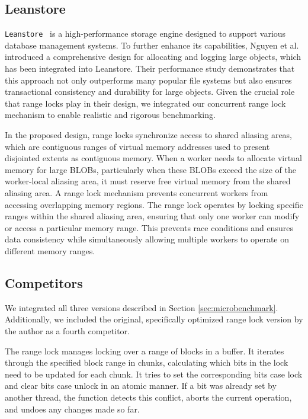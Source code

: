 \subsection{Leanstore}

\texttt{Leanstore}~\parencite{leis2018leanstore} is a high-performance storage engine designed to support various database management systems. 
To further enhance its capabilities, Nguyen et al.~\parencite{nguyen2024files} introduced a comprehensive design for allocating and logging large objects, which has been integrated into Leanstore. 
Their performance study demonstrates that this approach not only outperforms many popular file systems but also ensures transactional consistency and durability for large objects. Given the crucial role that range locks play in their design, we integrated our concurrent range lock mechanism to enable realistic and rigorous benchmarking.

In the proposed design, range locks synchronize access to shared aliasing areas, which are contiguous ranges of virtual memory addresses used to present disjointed extents as contiguous memory. 
When a worker needs to allocate virtual memory for large BLOBs, particularly when these BLOBs exceed the size of the worker-local aliasing area, it must reserve free virtual memory from the shared aliasing area. 
A range lock mechanism prevents concurrent workers from accessing overlapping memory regions. 
The range lock operates by locking specific ranges within the shared aliasing area, ensuring that only one worker can modify or access a particular memory range. 
This prevents race conditions and ensures data consistency while simultaneously allowing multiple workers to operate on different memory ranges. 

\subsection{Competitors}

We integrated all three versions described in Section \ref{sec:microbenchmark}. 
Additionally, we included the original, specifically optimized range lock version by the author as a fourth competitor. 

The range lock manages locking over a range of blocks in a buffer. It iterates through the specified block range in chunks, calculating which bits in the lock need to be updated for each chunk. It tries to set the corresponding bits case lock and clear bits case unlock in an atomic manner. If a bit was already set by another thread, the function detects this conflict, aborts the current operation, and undoes any changes made so far. 

